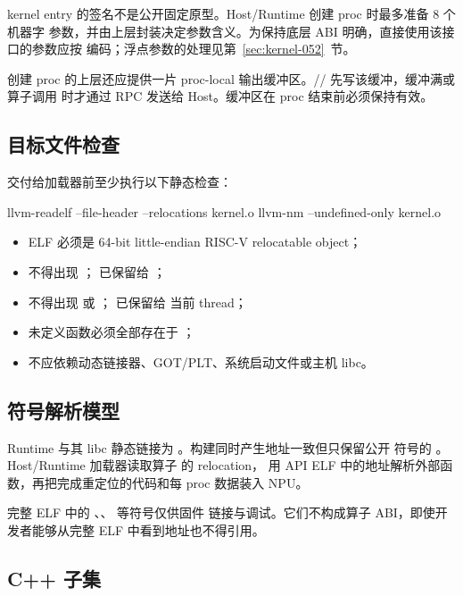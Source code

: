 \documentclass[../dayan_kernel_manual.tex]{subfiles}
\begin{document}
kernel entry 的签名不是公开固定原型。Host/Runtime 创建 proc 时最多准备 8 个机器字
参数，并由上层封装决定参数含义。为保持底层 ABI 明确，直接使用该接口的参数应按
 编码；浮点参数的处理见第~\ref{sec:kernel-052}~节。

创建 proc 的上层还应提供一片 proc-local 输出缓冲区。//
 先写该缓冲，缓冲满或算子调用  时才通过 RPC
发送给 Host。缓冲区在 proc 结束前必须保持有效。

\subsection{目标文件检查}

交付给加载器前至少执行以下静态检查：

\begin{dayancode}
llvm-readelf --file-header --relocations kernel.o
llvm-nm --undefined-only kernel.o
\end{dayancode}

\begin{itemize}
  \item ELF 必须是 64-bit little-endian RISC-V relocatable object；
  \item 不得出现 ； 已保留给 ；
  \item 不得出现  或 ； 已保留给
        当前 thread；
  \item 未定义函数必须全部存在于 ；
  \item 不应依赖动态链接器、GOT/PLT、系统启动文件或主机 libc。
\end{itemize}

\subsection{符号解析模型}

Runtime 与其 libc 静态链接为 。构建同时产生地址一致但只保留公开
符号的 。Host/Runtime 加载器读取算子  的 relocation，
用 API ELF 中的地址解析外部函数，再把完成重定位的代码和每 proc 数据装入 NPU。

完整 ELF 中的 、、 等符号仅供固件
链接与调试。它们不构成算子 ABI，即使开发者能够从完整 ELF 中看到地址也不得引用。

\subsection{C++ 子集}
\end{document}
